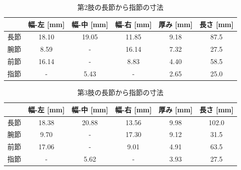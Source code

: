 %
\begin{table}[htbp]
  \centering
  \caption{第2肢の長節から指節の寸法}
  \label{tab:2setu}
  \vspace{-3mm}
  \begin{tabular}{|l|c|c|c|c|c|}
  \hline
     & \multicolumn{1}{l|}{幅-左 [mm]} & \multicolumn{1}{l|}{幅-中 [mm]} & \multicolumn{1}{l|}{幅-右 [mm]} & \multicolumn{1}{l|}{厚み [mm]} & \multicolumn{1}{l|}{長さ [mm]} \\ \hline
  長節 & 18.10                       & 19.05                       & 11.85                       & 9.18                        & 87.5                        \\ \hline
  腕節 & 8.59                        & -                           & 16.14                       & 7.32                        & 27.5                        \\ \hline
  前節 & 16.14                       & -                           & 8.83                        & 4.40                        & 58.5                        \\ \hline
  指節 & -                           & 5.43                        & -                           & 2.65                        & 25.0                        \\ \hline
  \end{tabular}
\end{table}
%
\begin{table}[htbp]
  \centering
  \caption{第3肢の長節から指節の寸法}
  \label{tab:3setu}
  \vspace{-3mm}
  \begin{tabular}{|l|c|c|c|c|c|}
  \hline
     & \multicolumn{1}{l|}{幅-左 [mm]} & \multicolumn{1}{l|}{幅-中 [mm]} & \multicolumn{1}{l|}{幅-右 [mm]} & \multicolumn{1}{l|}{厚み [mm]} & \multicolumn{1}{l|}{長さ [mm]} \\ \hline
  長節 & 18.38                       & 20.88                       & 13.56                       & 9.98                        & 102.0                       \\ \hline
  腕節 & 9.70                        & -                           & 17.30                       & 9.12                        & 31.5                        \\ \hline
  前節 & 17.06                       & -                           & 9.01                        & 4.91                        & 63.5                        \\ \hline
  指節 & -                           & 5.62                        & -                           & 3.93                        & 27.5                        \\ \hline
  \end{tabular}
\end{table}

